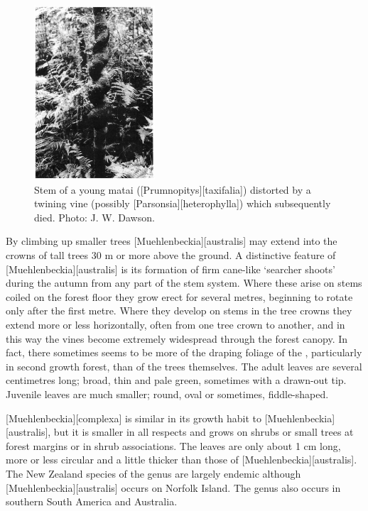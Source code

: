 \begin{figure}
	\includegraphics[width=0.4\textwidth]{graphics/figure35matai.jpg}
	\centering
	\caption[Stem of a young matai]{Stem of a young matai ([Prumnopitys][taxifalia]) distorted by a twining vine (possibly [Parsonsia][heterophylla]) which subsequently died.
	Photo: J. W. Dawson.}%
	\label{fig:35matai}
\end{figure}

By climbing up smaller trees [Muehlenbeckia][australis] may extend into the crowns of tall trees 30 m or more above the ground.
A distinctive feature of [Muehlenbeckia][australis] is its formation of firm cane-like `searcher shoots' during the autumn from any part of the stem system.
Where these arise on stems coiled on the forest floor they grow erect for several metres, beginning to rotate only after the first metre.
Where they develop on stems in the tree crowns they extend more or less horizontally, often from one tree crown to another, and in this way the vines become extremely widespread through the forest canopy.
In fact, there sometimes seems to be more of the draping foliage of the , particularly in second growth forest, than of the trees themselves.
The adult leaves are several centimetres long; broad, thin and pale green, sometimes with a drawn-out tip.
Juvenile leaves are much smaller; round, oval or sometimes, fiddle-shaped.

[Muehlenbeckia][complexa] is similar in its growth habit to [Muehlenbeckia][australis], but it is smaller in all respects and grows on shrubs or small trees at forest margins or in shrub associations.
The leaves are only about 1 cm long, more or less circular and a little thicker than those of [Muehlenbeckia][australis].
The New Zealand species of the genus are largely endemic although [Muehlenbeckia][australis] occurs on Norfolk Island.
The genus also occurs in southern South America and Australia.

